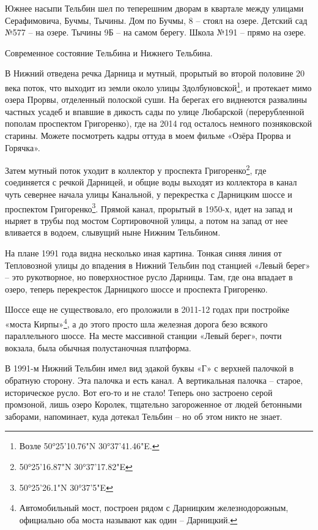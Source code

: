 Южнее насыпи Тельбин шел по теперешним дворам в квартале между улицами Серафимовича, Бучмы, Тычины. Дом по Бучмы, 8 – стоял на озере. Детский сад №577 – на озере. Тычины 9Б – на самом берегу. Школа №191 – прямо на озере.

Современное состояние Тельбина и Нижнего Тельбина.

В Нижний отведена речка Дарница и мутный, прорытый во второй половине 20 века поток, что выходит из земли около улицы Здолбуновской\footnote{Возле 50°25'10.76"N 30°37'41.46"E.}, и протекает мимо озера Прорвы, отделенный полоской суши. На берегах его виднеются развалины частных усадеб и впавшие в дикость сады по улице Любарской (перерубленной пополам проспектом Григоренко), где на 2014 год осталось немного позняковской старины. Можете посмотреть кадры оттуда в моем фильме «Озёра Прорва и Горячка».

Затем мутный поток уходит в коллектор у проспекта Григоренко\footnote{50°25'16.87"N 30°37'17.82"E}, где соединяется с речкой Дарницей, и общие воды выходят из коллектора в канал чуть севернее начала улицы Канальной, у перекрестка с Дарницким шоссе и проспектом Григоренко\footnote{50°25'26.1"N 30°37'5"E}. Прямой канал, прорытый в 1950-х, идет на запад и ныряет в трубы под мостом Сортировочной улицы, а потом на запад от нее вливается в водоем, слывущий ныне Нижним Тельбином.

На плане 1991 года видна несколько иная картина. Тонкая синяя линия от Тепловозной улицы до впадения в Нижний Тельбин под станцией «Левый берег» – это рукотворное, но поверхностное русло Дарницы. Там, где она впадает в озеро, теперь перекресток Дарницкого шоссе и проспекта Григоренко.

Шоссе еще не существовало, его проложили в 2011-12 годах при постройке «моста Кирпы»\footnote{Автомобильный мост, построен рядом с Дарницким железнодорожным, официально оба моста называют как один – Дарницкий.}, а до этого просто шла железная дорога безо всякого параллельного шоссе. На месте массивной станции «Левый берег», почти вокзала, была обычная полустаночная платформа. %

В 1991-м Нижний Тельбин имел вид эдакой буквы «Г» с верхней палочкой в обратную сторону. Эта палочка и есть канал. А вертикальная палочка – старое, историческое русло. Вот его-то и не стало! Теперь оно застроено серой промзоной, лишь озеро Королек, тщательно загороженное от людей бетонными заборами, напоминает, куда дотекал Тельбин – но об этом никто не знает. 

